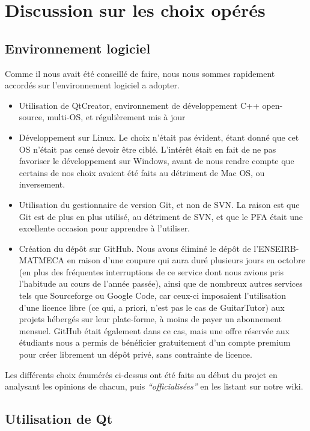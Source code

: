 \documentclass[a4paper,11pt]{article}
\begin{document}
\clearpage

\section{Discussion sur les choix opérés}

\subsection{Environnement logiciel}

Comme il nous avait été conseillé de faire, nous nous sommes rapidement accordés sur l'environnement logiciel a adopter.
\begin{itemize}
 \item Utilisation de QtCreator, environnement de développement C++ open-source, multi-OS, et régulièrement mis à jour
 \item Développement sur Linux. Le choix n'était pas évident, étant donné que cet OS n'était pas censé devoir être ciblé. L'intérêt était en fait de ne pas favoriser le développement sur Windows, avant de nous rendre compte que certains de nos choix avaient été faits au détriment de Mac OS, ou inversement.
 \item Utilisation du gestionnaire de version Git, et non de SVN. La raison est que Git est de plus en plus utilisé, au détriment de SVN, et que le PFA était une excellente occasion pour apprendre à l'utiliser.
 \item Création du dépôt sur GitHub. Nous avons éliminé le dépôt de l'ENSEIRB-MATMECA en raison d'une coupure qui aura duré plusieurs jours en octobre (en plus des fréquentes interruptions de ce service dont nous avions pris l'habitude au cours de l'année passée), ainsi que de nombreux autres services tels que Sourceforge ou Google Code, car ceux-ci imposaient l'utilisation d'une licence libre (ce qui, a priori, n'est pas le cas de GuitarTutor) aux projets hébergés sur leur plate-forme, à moins de payer un abonnement mensuel. GitHub était également dans ce cas, mais une offre réservée aux étudiants nous a permis de bénéficier gratuitement d'un compte premium pour créer librement un dépôt privé, sans contrainte de licence.
\end{itemize}

Les différents choix énumérés ci-dessus ont été faits au début du projet en analysant les opinions de chacun, puis \textit{``officialisées''} en les listant sur notre wiki.


\subsection{Utilisation de Qt}
\end{document}
